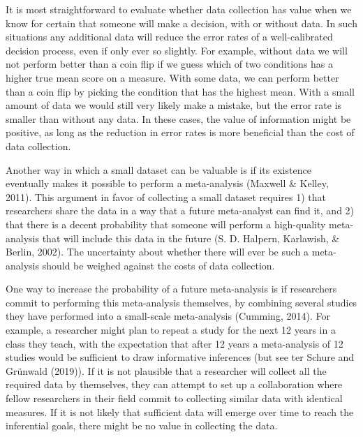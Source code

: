 \documentclass[
  english,
  ,jou,floatsintext]{apa6}
\begin{document}
It is most straightforward to evaluate whether data collection has value when we know for certain that someone will make a decision, with or without data. In such situations any additional data will reduce the error rates of a well-calibrated decision process, even if only ever so slightly. For example, without data we will not perform better than a coin flip if we guess which of two conditions has a higher true mean score on a measure. With some data, we can perform better than a coin flip by picking the condition that has the highest mean. With a small amount of data we would still very likely make a mistake, but the error rate is smaller than without any data. In these cases, the value of information might be positive, as long as the reduction in error rates is more beneficial than the cost of data collection.

Another way in which a small dataset can be valuable is if its existence eventually makes it possible to perform a meta-analysis (Maxwell \& Kelley, 2011). This argument in favor of collecting a small dataset requires 1) that researchers share the data in a way that a future meta-analyst can find it, and 2) that there is a decent probability that someone will perform a high-quality meta-analysis that will include this data in the future (S. D. Halpern, Karlawish, \& Berlin, 2002). The uncertainty about whether there will ever be such a meta-analysis should be weighed against the costs of data collection.

One way to increase the probability of a future meta-analysis is if researchers commit to performing this meta-analysis themselves, by combining several studies they have performed into a small-scale meta-analysis (Cumming, 2014). For example, a researcher might plan to repeat a study for the next 12 years in a class they teach, with the expectation that after 12 years a meta-analysis of 12 studies would be sufficient to draw informative inferences (but see ter Schure and Grünwald (2019)). If it is not plausible that a researcher will collect all the required data by themselves, they can attempt to set up a collaboration where fellow researchers in their field commit to collecting similar data with identical measures. If it is not likely that sufficient data will emerge over time to reach the inferential goals, there might be no value in collecting the data.
\end{document}
